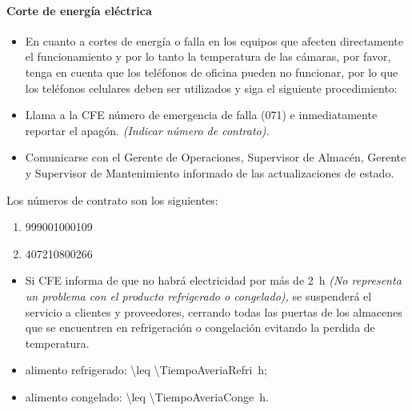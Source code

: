 \paragraph{Corte de energía eléctrica}
\begin{itemize}
	\item En cuanto a cortes de energía o falla en los equipos que afecten directamente el funcionamiento y por lo tanto la temperatura de las cámaras, por favor, tenga en cuenta que los teléfonos de oficina pueden no funcionar, por lo que los teléfonos celulares deben ser utilizados y siga el siguiente procedimiento:
	\item Llama a la \gls{CFE} número de emergencia de falla (071) e inmediatamente reportar el apagón. \emph{(Indicar número de contrato).}
	\item Comunicarse con el Gerente de Operaciones, Supervisor de Almacén, Gerente y Supervisor de Mantenimiento informado de las actualizaciones de estado.
\end{itemize}

\begin{note} \label{note:NumerosDeContratoCFE}
	Los números de contrato son los siguientes:
	\begin{enumerate}
		\item 999001000109
		\item 407210800266
	\end{enumerate}
\end{note}

\begin{itemize}
	\item Si \gls{CFE} informa de que no habrá electricidad por más de \qty{2}{\hour} \emph{(No representa un problema con el producto refrigerado o congelado),} se suspenderá el servicio a clientes y proveedores, cerrando todas las puertas de los almacenes que se encuentren en refrigeración o congelación evitando la perdida de temperatura.
\end{itemize}

\begin{note} \label{note:TMaxCamAveriada}
	\begin{itemize}
		\item \Gls{alimento} refrigerado: \qty{\leq \TiempoAveriaRefri}{\hour};
		\item \Gls{alimento} congelado: \qty{\leq \TiempoAveriaConge}{\hour}.
	\end{itemize}
\end{note}

